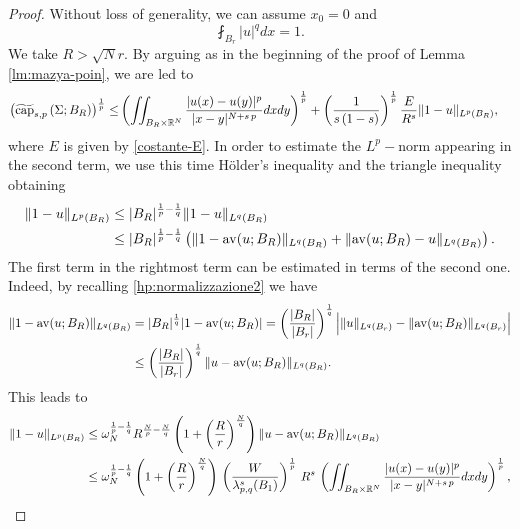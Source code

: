 \documentclass{amsart}
\theoremstyle{definition}
\numberwithin{equation}{section}
\begin{document}
\begin{proof}
	Without loss of generality, we can assume $x_0=0$ and 
	\begin{equation} \label{hp:normalizzazione2}
		\fint_{B_r} |u|^q dx = 1.
	\end{equation} 
	We take $R > \sqrt{N}r$. By arguing as in the beginning of the proof of Lemma \ref{lm:mazya-poin}, we are led to 
	\begin{equation} \label{quasi-cap2}
		\begin{split}
			\left(\widetilde{\rm cap}_{s,p}\left(\Sigma; B_{R}\right)\right)^{\frac{1}{p}} \le& \left(\iint_{B_{R} \times \mathbb{R}^N} \frac{|u(x) - u(y)|^p}{|x-y|^{N+s\,p}}dxdy\right)^{\frac{1}{p}} 
			+ \left(\frac{1}{s\,(1-s)}\right)^{\frac{1}{p}} \frac{E}{R^s} \|1-u\|_{L^p(B_{R})},
		\end{split}
	\end{equation}
	where $E$ is given by \eqref{costante-E}. In order to estimate the $L^p-$norm appearing in the second term, we use this time H\"older's inequality and the triangle inequality obtaining 
	\[
	\begin{split}
		\|1- u\|_{L^p(B_R)} &\le |B_R|^{\frac{1}{p} - \frac{1}{q}} \|1-u\|_{L^q(B_R)} \\
		&\le |B_R|^{\frac{1}{p} - \frac{1}{q}} \left(\|1-{\rm av}(u; B_R)\|_{L^q(B_R)} + \|{\rm av}(u; B_R) - u\|_{L^q(B_R)}\right).
	\end{split} 
	\]
	The first term in the rightmost term can be estimated in terms of the second one. Indeed, by recalling \eqref{hp:normalizzazione2} we have 
	\[
	\begin{split}
		\|1-{\rm av}(u; B_R)\|_{L^q(B_R)} &= |B_R|^{\frac{1}{q}} |1-{\rm av}(u; B_R)| = \left(\frac{|B_R|}{|B_r|}\right)^{\frac{1}{q}} \Big|\|u\|_{L^q(B_r)}  - \|{\rm av}(u; B_R)\|_{L^q(B_r)}\Big| \\
		&\le \left(\frac{|B_R|}{|B_r|}\right)^{\frac{1}{q}} \|u - {\rm av}(u; B_R)\|_{L^q(B_R)}.
	\end{split}
	\]
	This leads to 
	\[
	\begin{split}
		\|1- u\|_{L^p(B_R)} &\le \omega_N^{\frac{1}{p} - \frac{1}{q}}R^{\frac{N}{p} - \frac{N}{q}} \left(1+ \left(\frac{R}{r}\right)^{\frac{N}{q}} \right) \|u-{\rm av}(u; B_R)\|_{L^q(B_R)}\\
		&\le \omega_N^{\frac{1}{p} - \frac{1}{q}} \left(1+ \left(\frac{R}{r}\right)^{\frac{N}{q}} \right)\,\left(\frac{W}{\lambda_{p,q}^s(B_1)}\right)^{\frac{1}{p}}\,R^{ s}\,\left(\iint_{B_R \times \mathbb{R}^N} \frac{|u(x) - u(y)|^p}{|x-y|^{N+s\,p}}dxdy\right)^{\frac{1}{p}},

\end{split}\]
\end{proof}
\end{document}
